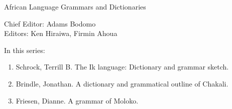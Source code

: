{\large African Language Grammars and Dictionaries}

\bigskip

Chief Editor:    Adams Bodomo \\
Editors:    Ken Hiraiwa,    Firmin Ahoua 

\bigskip

In this series:

\begin{enumerate}
\item Schrock, Terrill B. The Ik language: Dictionary and grammar sketch.
\item Brindle, Jonathan. A dictionary and grammatical outline of Chakali.
\item Friesen, Dianne. A grammar of Moloko.
\end{enumerate}


\vfill

